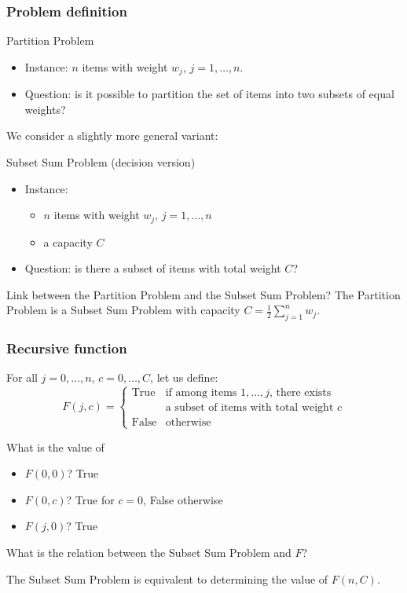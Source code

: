 \documentclass{beamer}
\begin{document}
\begin{frame}
  \frametitle{Problem definition}

  \begin{block}{Partition Problem}
    \begin{itemize}
      \item Instance: $n$ items with weight \alert{$w_j$}, $j = 1, \dots, n$.
      \item Question: is it possible to partition the set of items into two subsets of equal weights?
    \end{itemize}
  \end{block}

  \pause

  We consider a slightly more general variant:
  \begin{block}{Subset Sum Problem (decision version)}
    \begin{itemize}
      \item Instance:
        \begin{itemize}
          \item $n$ items with weight \alert{$w_j$}, $j = 1, \dots, n$
          \item a capacity \alert{$C$}
        \end{itemize}
      \item Question: is there a subset of items with total weight $C$?
    \end{itemize}
  \end{block}

  \pause
  Link between the Partition Problem and the Subset Sum Problem?
  \pause
  The Partition Problem is a Subset Sum Problem with capacity $C = \frac{1}{2} \sum_{j = 1}^n w_j$.
\end{frame}

\begin{frame}
  \frametitle{Recursive function}

  For all $j = 0, \dots, n$, $c = 0, \dots, C$, let us define:
  \begin{displaymath}
    F(j, c) =
    \left\{
      \begin{array}{ll}
        \text{True} & \text{if among items $1, \dots, j$, there exists} \\
        & \text{a subset of items with total weight $c$} \\
        \text{False} & \text{otherwise}
      \end{array}
    \right.
  \end{displaymath}

  \pause
  What is the value of
  \begin{itemize}
    \item $F(0, 0)$? \pause True \pause
    \item $F(0, c)$? \pause True for $c = 0$, False otherwise \pause
    \item $F(j, 0)$? \pause True \pause
  \end{itemize}

  What is the relation between the Subset Sum Problem and $F$? \pause

  The Subset Sum Problem is equivalent to determining the value of $F(n, C)$.
\end{frame}
\end{document}
